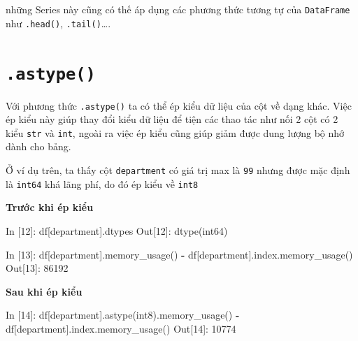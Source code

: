 \documentclass[
]{book}
\newenvironment{Shaded}{\begin{snugshade}}{\end{snugshade}}
\newcommand{\DecValTok}[1]{\textcolor[rgb]{0.00,0.00,0.81}{#1}}
\newcommand{\NormalTok}[1]{#1}
\newcommand{\OperatorTok}[1]{\textcolor[rgb]{0.81,0.36,0.00}{\textbf{#1}}}
\newcommand{\StringTok}[1]{\textcolor[rgb]{0.31,0.60,0.02}{#1}}
\begin{document}
những Series này cũng có thế áp dụng các phương thức tương tự của \texttt{DataFrame} như \texttt{.head()}, \texttt{.tail()}\ldots.

\section{\texorpdfstring{\texttt{.astype()}}{.astype()}}\label{astype}

Với phương thức \texttt{.astype()} ta có thể ép kiểu dữ liệu của cột về dạng khác. Việc ép kiểu này giúp thay đổi kiểu dữ liệu để tiện các thao tác như nối 2 cột có 2 kiểu \texttt{str} và \texttt{int}, ngoài ra việc ép kiểu cũng giúp giảm được dung lượng bộ nhớ dành cho bảng.

Ở ví dụ trên, ta thấy cột \texttt{department} có giá trị max là \texttt{99} nhưng được mặc định là \texttt{int64} khá lãng phí, do đó ép kiểu về \texttt{int8}

\textbf{Trước khi ép kiểu}

\begin{Shaded}
\begin{Highlighting}[]
\NormalTok{In [}\DecValTok{12}\NormalTok{]: df[}\StringTok{\textquotesingle{}department\textquotesingle{}}\NormalTok{].dtypes}
\NormalTok{Out[}\DecValTok{12}\NormalTok{]: dtype(}\StringTok{\textquotesingle{}int64\textquotesingle{}}\NormalTok{)}

\NormalTok{In [}\DecValTok{13}\NormalTok{]: df[}\StringTok{\textquotesingle{}department\textquotesingle{}}\NormalTok{].memory\_usage() }\OperatorTok{{-}}\NormalTok{ df[}\StringTok{\textquotesingle{}department\textquotesingle{}}\NormalTok{].index.memory\_usage()}
\NormalTok{Out[}\DecValTok{13}\NormalTok{]: }
\DecValTok{86192}
\end{Highlighting}
\end{Shaded}

\textbf{Sau khi ép kiểu}

\begin{Shaded}
\begin{Highlighting}[]
\NormalTok{In [}\DecValTok{14}\NormalTok{]: df[}\StringTok{\textquotesingle{}department\textquotesingle{}}\NormalTok{].astype(}\StringTok{\textquotesingle{}int8\textquotesingle{}}\NormalTok{).memory\_usage() }\OperatorTok{{-}}\NormalTok{ df[}\StringTok{\textquotesingle{}department\textquotesingle{}}\NormalTok{].index.memory\_usage()}
\NormalTok{Out[}\DecValTok{14}\NormalTok{]: }
\DecValTok{10774}
\end{Highlighting}
\end{Shaded}
\end{document}
